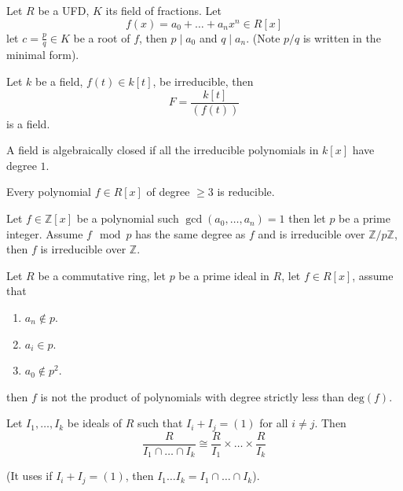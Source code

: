 \documentclass[openany]{book}
\newcommand{\Z}{\mathbb{Z}}
\begin{document}
\begin{prop}
    Let $R$ be a UFD, $K$ its field of fractions.  Let 
    \begin{equation*}
        f(x)=a_0+\dots+a_nx^n\in R[x]
    \end{equation*}
    let $c=\frac{p}{q}\in K$ be a root of $f$, then $p\mid a_0$ and $q\mid a_n$.  (Note $p/q$ is written in the minimal form).
\end{prop}


\begin{prop}
    Let $k$ be a field, $f(t)\in k[t]$, be irreducible, then 
    \begin{equation*}
        F=\frac{k[t]}{(f(t))}
    \end{equation*}
    is a field.
\end{prop}


\begin{defn}
    A field is algebraically closed if all the irreducible polynomials in $k[x]$ have degree $1$.
\end{defn}


\begin{prop}
    Every polynomial $f\in R[x]$ of degree $\geq 3$ is reducible.
\end{prop}

\begin{prop}
    Let $f\in\Z[x]$ be a polynomial such $\gcd(a_0,\dots, a_n)=1$ then let $p$ be a prime integer. Assume $f\mod p$ has the same degree as $f$ and is irreducible over $\Z/p\Z$, then $f$ is irreducible over $\Z$.
\end{prop}

\begin{prop}
    Let $R$ be a commutative ring, let $p$ be a prime ideal in $R$, let $f\in R[x]$, assume that 
    \begin{enumerate}
        \item $a_n\not\in p$.
        \item $a_i\in p$.
        \item $a_0\not\in p^2$.
    \end{enumerate}
    then $f$ is not the product of polynomials with degree strictly less than $\text{deg}(f)$.
\end{prop}


\begin{thm}[CRT]
    Let $I_1,\dots, I_k$ be ideals of $R$ such that $I_i+I_j=(1)$ for all $i\neq j$. Then 
    \begin{equation*}
        \frac{R}{I_1\cap\dots\cap I_k}\cong\frac{R}{I_1}\times\dots\times\frac{R}{I_k}
    \end{equation*}

    (It uses if $I_i+I_j=(1)$, then $I_1\dots I_k=I_1\cap\dots\cap I_k$).
\end{thm}
\end{document}
